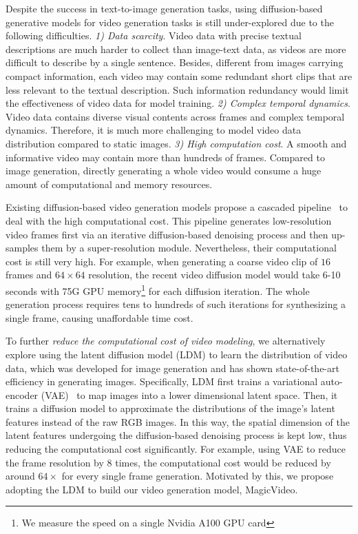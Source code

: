 \documentclass[10pt,twocolumn,letterpaper]{article}
\begin{document}
Despite the success in text-to-image generation tasks, using diffusion-based generative models for video generation tasks  is still under-explored due to the following difficulties. \textit{1) Data scarcity}. Video data with precise textual descriptions are much harder to collect than image-text data, as videos are more difficult to   describe by a single sentence. Besides, different from images carrying compact information, each video may contain some redundant short clips that are   less relevant to the textual description. Such information redundancy  would limit     the effectiveness  of video data for model training. \textit{2) Complex temporal dynamics}. Video data contains diverse visual contents across frames and complex temporal dynamics. Therefore, it is much more challenging to model video data distribution compared to static images. \textit{3) High computation cost}. A smooth and informative video may contain more than hundreds of   frames. Compared to image generation, directly generating a whole video would consume  a huge amount of computational and memory resources.

Existing diffusion-based video generation models propose a cascaded pipeline~\cite{ho2022video} to deal with the high computational cost. This pipeline generates low-resolution video frames first via an iterative diffusion-based denoising process and then up-samples them  by a super-resolution module. Nevertheless, their computational cost  is still very high. For example, when generating a coarse  video clip of $16$ frames and $64\times 64$ resolution, the recent video diffusion model \cite{ho2022video}  would take 6-10 seconds with 75G GPU memory\footnote{We measure the speed on a single Nvidia A100 GPU card} for each diffusion iteration. The whole   generation process requires tens to hundreds of such  iterations for synthesizing a single frame,  causing unaffordable time cost.  


To further \textit{reduce the computational cost of video modeling}, we alternatively explore using the latent diffusion model (LDM) \cite{rombach_high-resolution_2022}  to learn the distribution of video data, which was developed   for image generation and   has shown state-of-the-art efficiency in generating images. Specifically, LDM first trains a variational auto-encoder (VAE)~\cite{rezende2014stochastic, razavi2019generating} to map images into a lower dimensional latent space. Then, it trains a diffusion model to approximate the distributions of the image's latent features instead of the raw RGB images. 
In this way, the spatial dimension of the latent features undergoing the diffusion-based denoising process is kept low,  thus reducing the computational cost significantly. For example, using VAE to reduce  the   frame resolution by 8 times, 
the computational cost would be reduced by around $64\times$ for every single frame generation. Motivated by this, we propose adopting the LDM to build our video generation model, MagicVideo.  
\end{document}
